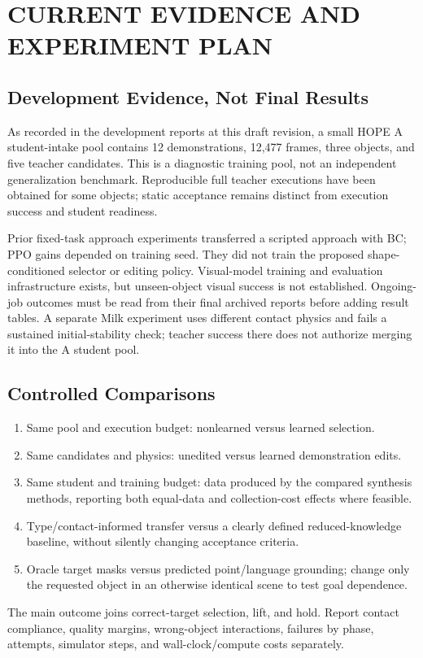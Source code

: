 \documentclass[letterpaper, 10 pt, conference]{ieeeconf}
\begin{document}
\section{CURRENT EVIDENCE AND EXPERIMENT PLAN}
\subsection{Development Evidence, Not Final Results}
As recorded in the development reports at this draft revision, a small HOPE A
student-intake pool contains 12 demonstrations, 12,477 frames, three objects,
and five teacher candidates. This is a diagnostic training pool, not an
independent generalization benchmark. Reproducible full teacher executions have
been obtained for some objects; static acceptance remains distinct from
execution success and student readiness.

Prior fixed-task approach experiments transferred a scripted approach with BC;
PPO gains depended on training seed. They did not train the proposed
shape-conditioned selector or editing policy. Visual-model training and
evaluation infrastructure exists, but unseen-object visual success is not
established. Ongoing-job outcomes must be read from their final archived
reports before adding result tables. A separate Milk experiment uses different
contact physics and fails a sustained initial-stability check; teacher success
there does not authorize merging it into the A student pool.

\subsection{Controlled Comparisons}
\begin{enumerate}
\item Same pool and execution budget: nonlearned versus learned selection.
\item Same candidates and physics: unedited versus learned demonstration edits.
\item Same student and training budget: data produced by the compared synthesis
methods, reporting both equal-data and collection-cost effects where feasible.
\item Type/contact-informed transfer versus a clearly defined reduced-knowledge
baseline, without silently changing acceptance criteria.
\item Oracle target masks versus predicted point/language grounding; change only
the requested object in an otherwise identical scene to test goal dependence.
\end{enumerate}
The main outcome joins correct-target selection, lift, and hold. Report contact
compliance, quality margins, wrong-object interactions, failures by phase,
attempts, simulator steps, and wall-clock/compute costs separately.
\end{document}
